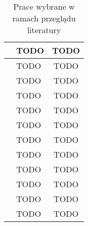\begin{table}[h!]
\begin{tabular}{|c|l|c|}
    \hline
    \cite{9027427} & TODO & TODO \\
    \hline
    \cite{8513710} & TODO & TODO \\
    \hline
    \cite{Cavalheiro202389} & TODO & TODO \\
    \hline
    \cite{raza2021sok} & TODO & TODO \\
    \hline
    \cite{LEITNER2019340} & TODO & TODO \\
    \hline
    \cite{eismann2021reviewserverlessusecases} & TODO & TODO \\
    \hline
    \cite{Ivanov_Petrova_2024} & TODO & TODO \\
    \hline
    \cite{aaaa} & TODO & TODO \\
    \hline
    \cite{aaaa} & TODO & TODO \\
    \hline
    \cite{aaaa} & TODO & TODO \\
    \hline
    \cite{aaaa} & TODO & TODO \\
    \hline
    \cite{aaaa} & TODO & TODO \\
    \hline
    \end{tabular}
    \caption{Prace wybrane w ramach przeglądu literatury}
\end{table}
